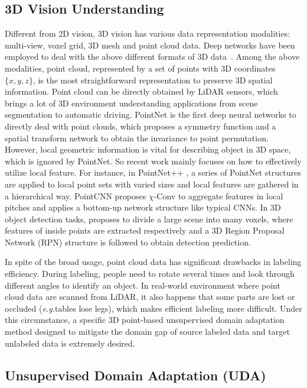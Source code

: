 \documentclass{article}
\newcommand*\eg{\textit{e.g.}}
\begin{document}
\subsection{3D Vision Understanding}

Different from 2D vision, 3D vision has various data representation modalities:  multi-view, voxel grid, 3D mesh and point cloud data. Deep networks have been employed to deal with the above different formats of 3D data~\cite{su2015multi,maturana2015voxnet,you2018pvnet, feng2019meshnet}. Among the above modalities, point cloud, represented by a set of points with 3D coordinates $\{x,y,z\}$, is the most straightforward representation to preserve 3D spatial information. Point cloud can be directly obtained by LiDAR sensors, which brings a lot of 3D environment understanding applications from scene segmentation to automatic driving. PointNet \cite{qi2017pointnet} is the first deep neural networks to directly deal with point clouds, which proposes a symmetry function and a spatial transform network to obtain the invariance to point permutation. However, local geometric information is vital for describing object in 3D space, which is ignored by PointNet. So recent work mainly focuses on how to effectively utilize local feature. For instance, in PointNet++ \cite{qi2017pointnet++}, a series of PointNet structures are applied to local point sets with varied sizes and local features are gathered in a hierarchical way. PointCNN \cite{li2018pointcnn} proposes $\chi$-Conv to aggregate features in local pitches and applies a bottom-up network structure like typical CNNs. In 3D object detection tasks, \cite{zhou2018voxelnet} proposes to divide a large scene into many voxels, where features of inside points are extracted respectively and a 3D Region Proposal Network (RPN) structure is followed to obtain detection prediction.

In spite of the broad usage, point cloud data has significant drawbacks in labeling efficiency. During labeling, people need to rotate several times and look through different angles to identify an object. In real-world environment where point cloud data are scanned from LiDAR, it also happens that some parts are lost or occluded (\eg{tables lose legs}), which makes efficient labeling more difficult. Under this circumstance, a specific 3D point-based unsupervised domain adaptation method designed to mitigate the domain gap of source labeled data and target unlabeled data is extremely desired.


\subsection{Unsupervised Domain Adaptation (UDA)}
\end{document}
